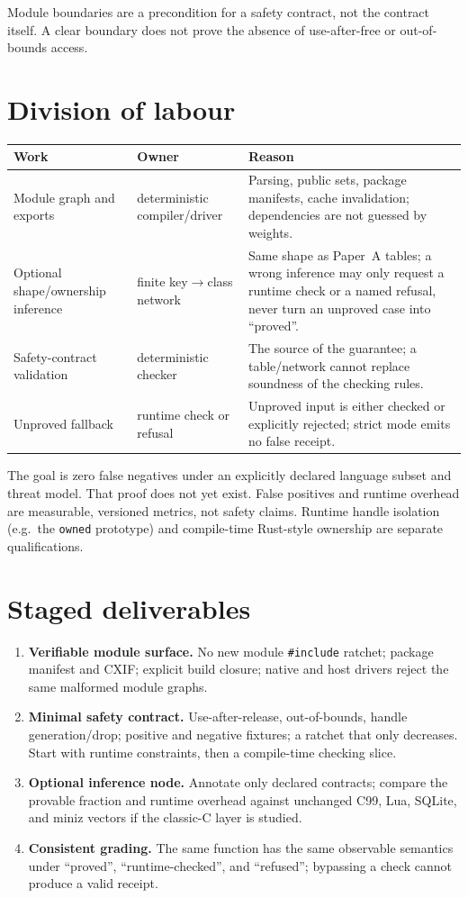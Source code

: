 \documentclass[11pt]{article}
\begin{document}
Module boundaries are a precondition for a safety contract, not the contract
itself. A clear boundary does not prove the absence of use-after-free or
out-of-bounds access.

\section{Division of labour}

\begin{longtable}{@{}p{}p{}p{}@{}}
\toprule
Work & Owner & Reason \\
\midrule
Module graph and exports & deterministic compiler/driver & Parsing, public sets,
package manifests, cache invalidation; dependencies are not guessed by weights. \\
Optional shape/ownership inference & finite key$\to$class network & Same shape
as Paper~A tables; a wrong inference may only request a runtime check or a named
refusal, never turn an unproved case into ``proved''. \\
Safety-contract validation & deterministic checker & The source of the guarantee;
a table/network cannot replace soundness of the checking rules. \\
Unproved fallback & runtime check or refusal & Unproved input is either checked or
explicitly rejected; strict mode emits no false receipt. \\
\bottomrule
\end{longtable}

The goal is zero false negatives under an explicitly declared language subset and
threat model. That proof does not yet exist. False positives and runtime overhead
are measurable, versioned metrics, not safety claims. Runtime handle isolation
(e.g.\ the \texttt{owned} prototype) and compile-time Rust-style ownership are
separate qualifications.

\section{Staged deliverables}

\begin{enumerate}
\item \textbf{Verifiable module surface.} No new module \texttt{\#include}
  ratchet; package manifest and CXIF; explicit build closure; native and host
  drivers reject the same malformed module graphs.
\item \textbf{Minimal safety contract.} Use-after-release, out-of-bounds, handle
  generation/drop; positive and negative fixtures; a ratchet that only decreases.
  Start with runtime constraints, then a compile-time checking slice.
\item \textbf{Optional inference node.} Annotate only declared contracts; compare
  the provable fraction and runtime overhead against unchanged C99, Lua, SQLite,
  and miniz vectors if the classic-C layer is studied.
\item \textbf{Consistent grading.} The same function has the same observable
  semantics under ``proved'', ``runtime-checked'', and ``refused''; bypassing a
  check cannot produce a valid receipt.
\end{enumerate}
\end{document}

